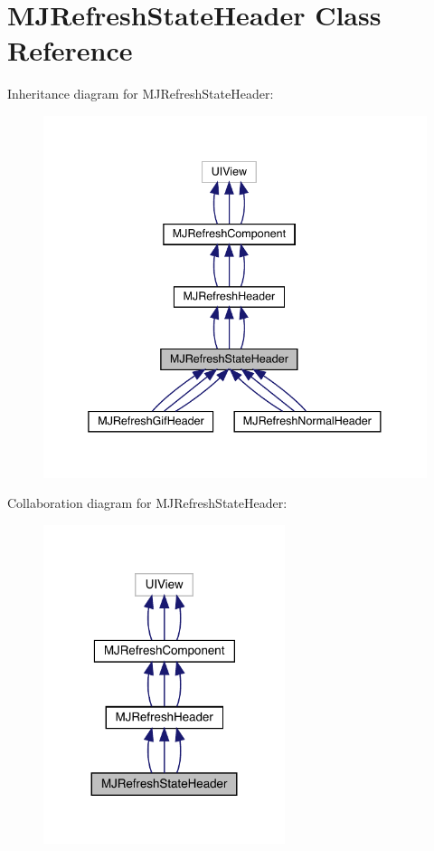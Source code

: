 \hypertarget{interface_m_j_refresh_state_header}{}\section{M\+J\+Refresh\+State\+Header Class Reference}
\label{interface_m_j_refresh_state_header}


Inheritance diagram for M\+J\+Refresh\+State\+Header\+:\nopagebreak
\begin{figure}[H]
\begin{center}
\leavevmode
\includegraphics[width=338pt]{interface_m_j_refresh_state_header__inherit__graph}
\end{center}
\end{figure}


Collaboration diagram for M\+J\+Refresh\+State\+Header\+:\nopagebreak
\begin{figure}[H]
\begin{center}
\leavevmode
\includegraphics[width=200pt]{interface_m_j_refresh_state_header__coll__graph}
\end{center}
\end{figure}
